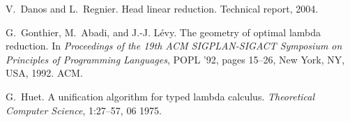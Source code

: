 \documentclass[xchauthor,chkrefs,GCNS,amsmath,amsthm,rotating,leaveRGB]{tcsg}
\theoremstyle{plain}
\theoremstyle{definition}
\begin{document}
\begin{backmatter}
\begin{thebibliography}{}
\begin{bsubitem}
\begin{bcontribution}%
\end{bcontribution}
\prnsep{,\ }
\begin{bhost}
\begin{bbook}[class=report]
\end{bbook}
\end{bhost}
\end{bsubitem}
%
\OrigBibText
V.~Danos and L.~Regnier.
 Head linear reduction.
 Technical report, 2004.
\endOrigBibText
{}%
\endbibitem

\begin{bsubitem}
\begin{bcontribution}%
\end{bcontribution}
\begin{bhost}
\begin{beditedbook}
\end{beditedbook}
\end{bhost}
\end{bsubitem}
%
\OrigBibText
G.~Gonthier, M.~Abadi, and J.-J. L{\'e}vy.
 The geometry of optimal lambda reduction.
 In \emph{Proceedings of the 19th ACM SIGPLAN-SIGACT Symposium on
 Principles of Programming Languages}, POPL '92, pages 15--26, New York, NY,
 USA, 1992. ACM.
\endOrigBibText
{}%
\endbibitem

\begin{bsubitem}
\begin{bcontribution}%
\end{bcontribution}
\begin{bhost}
\begin{bissue}
\end{bissue}
\end{bhost}
\end{bsubitem}
%
\OrigBibText
G.~Huet.
 A unification algorithm for typed lambda calculus.
 \emph{Theoretical Computer Science}, 1:27--57, 06 1975.
\endOrigBibText
{}%
\endbibitem


\end{thebibliography}
\end{backmatter}
\end{document}
